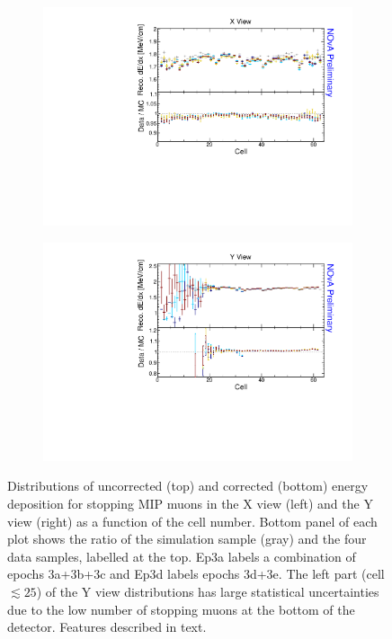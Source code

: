 \begin{figure}[!ht]
\begin{subfigure}{0.495\textwidth}
  \end{subfigure}
  \begin{subfigure}{0.495\textwidth}
    \includegraphics[width=\linewidth]{Plots/Calibana/recomevcm_cell_x.pdf}
  \end{subfigure}
  \begin{subfigure}{0.495\textwidth}
    \includegraphics[width=\linewidth]{Plots/Calibana/recomevcm_cell_y.pdf}
  \end{subfigure}
  \caption[Validation plots for stopping muons across cells]{Distributions of uncorrected (top) and corrected (bottom) energy deposition for stopping \acrshort{MIP} muons in the X view (left) and the Y view (right) as a function of the cell number. Bottom panel of each plot shows the ratio of the simulation sample (gray) and the four data samples, labelled at the top. Ep3a labels a combination of epochs 3a+3b+3c and Ep3d labels epochs 3d+3e. The left part (cell $\lesssim 25$) of the Y view distributions has large statistical uncertainties due to the low number of stopping muons at the bottom of the detector. Features described in text.}
  \label{fig:AbsCalibCell1}
\end{figure}

